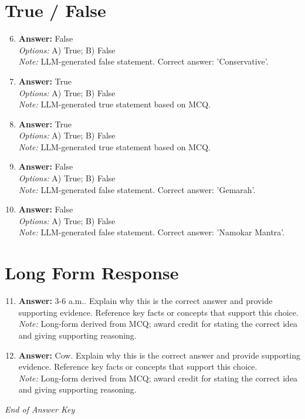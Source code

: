 \documentclass[12pt]{article}
\begin{document}
\section*{True / False}
\begin{enumerate}[label=\arabic*.]
\setcounter{enumi}{5}
\item \textbf{Answer:} False
\\ \textit{Options:} A) True; B) False
\\ \textit{Note:} LLM-generated false statement. Correct answer: 'Conservative'.
\item \textbf{Answer:} True
\\ \textit{Options:} A) True; B) False
\\ \textit{Note:} LLM-generated true statement based on MCQ.
\item \textbf{Answer:} True
\\ \textit{Options:} A) True; B) False
\\ \textit{Note:} LLM-generated true statement based on MCQ.
\item \textbf{Answer:} False
\\ \textit{Options:} A) True; B) False
\\ \textit{Note:} LLM-generated false statement. Correct answer: 'Gemarah'.
\item \textbf{Answer:} False
\\ \textit{Options:} A) True; B) False
\\ \textit{Note:} LLM-generated false statement. Correct answer: 'Namokar Mantra'.
\end{enumerate}

\section*{Long Form Response}
\begin{enumerate}[label=\arabic*.]
\setcounter{enumi}{10}
\item \textbf{Answer:} 3-6 a.m.. Explain why this is the correct answer and provide supporting evidence. Reference key facts or concepts that support this choice.
\\ \textit{Note:} Long-form derived from MCQ; award credit for stating the correct idea and giving supporting reasoning.
\item \textbf{Answer:} Cow. Explain why this is the correct answer and provide supporting evidence. Reference key facts or concepts that support this choice.
\\ \textit{Note:} Long-form derived from MCQ; award credit for stating the correct idea and giving supporting reasoning.
\end{enumerate}

\vfill
\noindent\textit{End of Answer Key}
\end{document}
